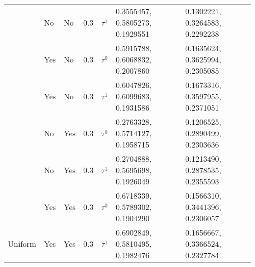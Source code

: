 \begin{tabular}[t]{lllrlll}
 & No & No & 0.3 & $\tau^1$ & 0.3555457, 0.5805273, 0.1929551 & 0.1302221, 0.3264583, 0.2292238\\

 & Yes & No & 0.3 & $\tau^0$ & 0.5915788, 0.6068832, 0.2007860 & 0.1635624, 0.3625994, 0.2305085\\

 & Yes & No & 0.3 & $\tau^1$ & 0.6047826, 0.6099683, 0.1931586 & 0.1673316, 0.3597955, 0.2371051\\

 & No & Yes & 0.3 & $\tau^0$ & 0.2763328, 0.5714127, 0.1958715 & 0.1206525, 0.2890499, 0.2303636\\

 & No & Yes & 0.3 & $\tau^1$ & 0.2704888, 0.5695698, 0.1926049 & 0.1213490, 0.2878535, 0.2355593\\

 & Yes & Yes & 0.3 & $\tau^0$ & 0.6718339, 0.5789302, 0.1904290 & 0.1566310, 0.3441396, 0.2306057\\

\multirow{-8}{*}{\raggedright\arraybackslash Uniform} & Yes & Yes & 0.3 & $\tau^1$ & 0.6902849, 0.5810495, 0.1982476 & 0.1656667, 0.3366524, 0.2327784\\
\bottomrule
\end{tabular}
